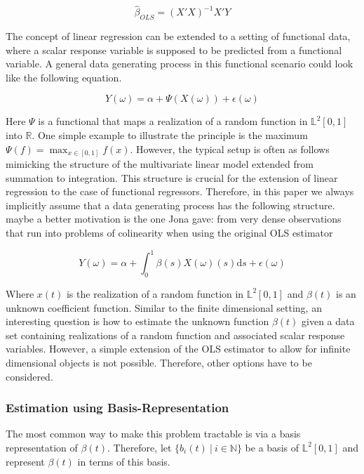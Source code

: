\documentclass[11pt,twoside,a4paper]{article}
\begin{document}
	\begin{equation}
		\hat{\beta}_{OLS} = (X'X)^{-1}X'Y
	\end{equation}
	
	The concept of linear regression can be extended to a setting of functional data, where a scalar response variable is supposed to be predicted from a functional variable. 
	A general data generating process in this functional scenario could look like the following equation.
	
	\begin{equation}
		Y(\omega) = \alpha + \Psi\left(X(\omega)\right) + \epsilon(\omega)
	\end{equation}
	
	Here $\Psi$ is a functional that maps a realization of a random function in $\mathbb{L}^2[0,1]$ into $\mathbb{R}$. One simple example to illustrate the principle is the maximum $\Psi(f) = \max_{x \in [0,1]}f(x)$.
	However, the typical setup is often as follows mimicking the structure of the multivariate linear model extended from summation to integration. This structure is crucial for the extension of linear regression to the case of functional regressors. Therefore, in this paper we always implicitly assume that a data generating process has the following structure. {\color{red} maybe a better motivation is the one Jona gave: from very dense observations that run into problems of colinearity when using the original OLS estimator}
	
	\begin{equation}\label{DGP}
		Y(\omega) = \alpha + \int_{0}^{1} \beta(s)X(\omega)(s) \mathrm{d}s + \epsilon(\omega)
	\end{equation}
	
	Where $x(t)$ is the realization of a random function in $\mathbb{L}^2[0,1]$ and $\beta(t)$ is an unknown coefficient function. 
	Similar to the finite dimensional setting, an interesting question is how to estimate the unknown function $\beta(t)$ given a data set containing realizations of a random function and associated scalar response variables. However, a simple extension of the OLS estimator to allow for infinite dimensional objects is not possible. Therefore, other options have to be considered.
	
	\subsubsection{Estimation using Basis-Representation}
	The most common way to make this problem tractable is via a basis representation of $\beta(t)$. Therefore, let $\{b_i(t) \: \vert \: i \in \mathbb{N}\}$ be a basis of $\mathbb{L}^2[0,1]$ and represent $\beta(t)$ in terms of this basis.
	
\end{document}
